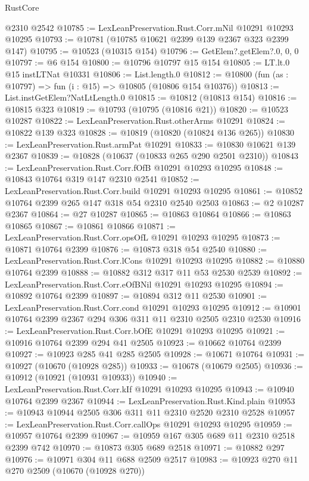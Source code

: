 \begin{lexlean}{RustCore}
\begin{coremodule}
    @2310
    @2542
@10785 := LexLeanPreservation.Rust.Corr.mNil @10291 @10293 @10295
@10793 := @10781 (@10785 @10621 @2399 @139 @2367 @323 @2399 @147)
@10795 := @10523 (@10315 @154)
@10796 := GetElem?.getElem?.{0, 0, 0}
@10797 := @6 @154
@10800 := @10796 @10797 @15 @154
@10805 := LT.lt.{0} @15 instLTNat @10331
@10806 := List.length.{0}
@10812 := @10800 (fun (as : @10797) => fun (i : @15) => @10805 (@10806 @154 @10376))
@10813 := List.instGetElem?NatLtLength.{0}
@10815 := @10812 (@10813 @154)
@10816 := @10815 @323
@10819 := @10793 (@10795 (@10816 @21))
@10820 := @10523 @10287
@10822 := LexLeanPreservation.Rust.otherArms @10291
@10824 := @10822 @139 @323
@10828 := @10819 (@10820 (@10824 @136 @265))
@10830 := LexLeanPreservation.Rust.armPat @10291
@10833 := @10830 @10621 @139 @2367
@10839 := @10828 (@10637 (@10833 @265 @290 @2501 @2310))
@10843 := LexLeanPreservation.Rust.Corr.fOfB @10291 @10293 @10295
@10848 := @10843 @10764 @319 @147 @2310 @2541
@10852 := LexLeanPreservation.Rust.Corr.build @10291 @10293 @10295
@10861 := @10852 @10764 @2399 @265 @147 @318 @54 @2310 @2540 @2503
@10863 := @2 @10287 @2367
@10864 := @27 @10287
@10865 := @10863 @10864
@10866 := @10863 @10865
@10867 := @10861 @10866
@10871 := LexLeanPreservation.Rust.Corr.opsOfL @10291 @10293 @10295
@10873 := @10871 @10764 @2399
@10876 := @10873 @318 @54 @2540
@10880 := LexLeanPreservation.Rust.Corr.lCons @10291 @10293 @10295
@10882 := @10880 @10764 @2399
@10888 := @10882 @312 @317 @11 @53 @2530 @2539
@10892 := LexLeanPreservation.Rust.Corr.eOfBNil @10291 @10293 @10295
@10894 := @10892 @10764 @2399
@10897 := @10894 @312 @11 @2530
@10901 := LexLeanPreservation.Rust.Corr.cond @10291 @10293 @10295
@10912 := @10901 @10764 @2399 @2367 @294 @306 @311 @11 @2310 @2505 @2310 @2530
@10916 := LexLeanPreservation.Rust.Corr.bOfE @10291 @10293 @10295
@10921 := @10916 @10764 @2399 @294 @41 @2505
@10923 := @10662 @10764 @2399
@10927 := @10923 @285 @41 @285 @2505
@10928 := @10671 @10764
@10931 := @10927 (@10670 (@10928 @285))
@10933 := @10678 (@10679 @2505)
@10936 := @10912 (@10921 (@10931 @10933))
@10940 := LexLeanPreservation.Rust.Corr.kIf @10291 @10293 @10295
@10943 := @10940 @10764 @2399 @2367
@10944 := LexLeanPreservation.Rust.Kind.plain
@10953 := @10943 @10944 @2505 @306 @311 @11 @2310 @2520 @2310 @2528
@10957 := LexLeanPreservation.Rust.Corr.callOps @10291 @10293 @10295
@10959 := @10957 @10764 @2399
@10967 := @10959 @167 @305 @689 @11 @2310 @2518 @2399 @742
@10970 := @10873 @305 @689 @2518
@10971 := @10882 @297
@10976 := @10971 @304 @11 @688 @2509 @2517
@10983 := @10923 @270 @11 @270 @2509 (@10670 (@10928 @270))

\end{coremodule}
\end{lexlean}
